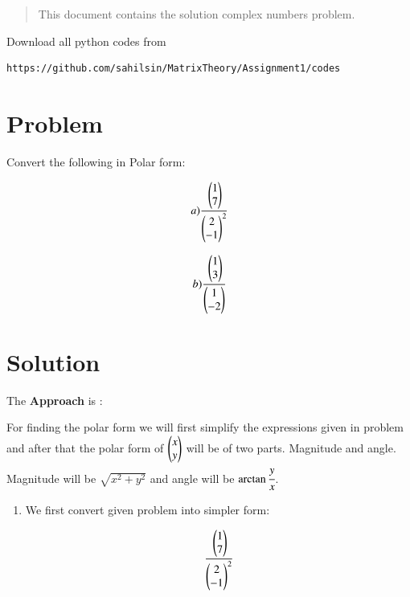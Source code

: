 \begin{enumerate}[label=\thesection.\arabic*.,ref=\thesection.\theenumi]

\begin{abstract}
This document contains the solution complex numbers problem.
\end{abstract}
Download all python codes from 
%
\begin{lstlisting}
https://github.com/sahilsin/MatrixTheory/Assignment1/codes
\end{lstlisting}

\section{Problem}

Convert the following in Polar form:

\begin{align}
        a)  \cfrac{\begin{pmatrix}1 \\ 7\end{pmatrix}}{\begin{pmatrix}2 \\ -1\end{pmatrix}^{2}}
\end{align}

\begin{align}
        b)  \cfrac{\begin{pmatrix}1 \\ 3\end{pmatrix}}{\begin{pmatrix}1 \\ -2\end{pmatrix}}
\end{align}


\section{Solution}
The \textbf{Approach} is :
\begin{flushleft}
    For finding the polar form we will first simplify the expressions given in problem and after that the polar form of $\begin{pmatrix}x \\ y\end{pmatrix}$ will be of two parts. Magnitude and angle. Magnitude will be $\sqrt{x^2 + y^2}$ and angle will be $\arctan\cfrac{y}{x}$.
\end{flushleft}

\begin{enumerate}
    \item We first convert given problem into simpler form:

\begin{align}
    \cfrac{\begin{pmatrix}1 \\ 7\end{pmatrix}}{\begin{pmatrix}2 \\ -1\end{pmatrix}^{2}}\\
\end{align} 


\end{enumerate}
\end{enumerate}
